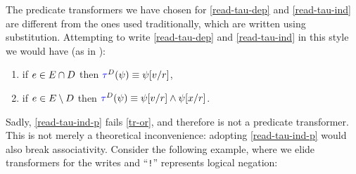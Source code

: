 The predicate transformers we have chosen for \ref{read-tau-dep} and
\ref{read-tau-ind} are different from the ones used traditionally, which are
written using substitution.
Attempting to write \ref{read-tau-dep} and \ref{read-tau-ind} in
this style we would have (as in \cite{DBLP:journals/pacmpl/JagadeesanJR20}):
\begin{enumerate}[topsep=0pt]
\item[{\labeltext[\textsc{r}4a$'$]{(\textsc{r}4a$'$)}{read-tau-dep-p}}]
  if $e\in E\cap D$ then
  \begin{math}
    \aTr{\bEvs}{\bForm} \riff    
    \bForm[\aVal/\aReg]
  \end{math},    
\item[{\labeltext[\textsc{r}4b$'$]{(\textsc{r}4b$'$)}{read-tau-ind-p}}]
  if $e\in E\setminus D$ then
  \begin{math}
    \aTr{\bEvs}{\bForm} \riff    
    \bForm[\aVal/\aReg]
    \land
    \bForm[\aLoc/\aReg]
  \end{math}.
\end{enumerate}
Sadly, \ref{read-tau-ind-p} fails \ref{tr-or}, and therefore is not a
predicate transformer.  This is not merely a theoretical inconvenience:
adopting \ref{read-tau-ind-p} would also break associativity.  Consider the
following example, where we elide transformers for the writes and ``\texttt{!}''
represents logical negation:
